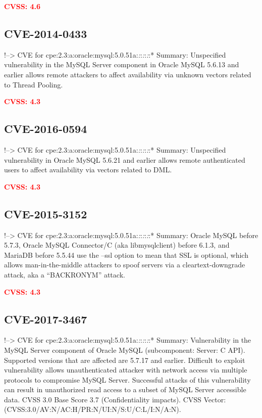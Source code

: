 \documentclass[a4paper, 12pt]{article}
\begin{document}
\textbf{\textcolor{red}{CVSS: 4.6}}

\hypertarget{cve-2014-0433}{%
\subsection{CVE-2014-0433}\label{cve-2014-0433}}

!--\textgreater{} CVE for
cpe:2.3:a:oracle:mysql:5.0.51a:\emph{:}:\emph{:}:\emph{:}:* Summary:
Unspecified vulnerability in the MySQL Server component in Oracle MySQL
5.6.13 and earlier allows remote attackers to affect availability via
unknown vectors related to Thread Pooling.

\textbf{\textcolor{red}{CVSS: 4.3}}

\hypertarget{cve-2016-0594}{%
\subsection{CVE-2016-0594}\label{cve-2016-0594}}

!--\textgreater{} CVE for
cpe:2.3:a:oracle:mysql:5.0.51a:\emph{:}:\emph{:}:\emph{:}:* Summary:
Unspecified vulnerability in Oracle MySQL 5.6.21 and earlier allows
remote authenticated users to affect availability via vectors related to
DML.

\textbf{\textcolor{red}{CVSS: 4.3}}

\hypertarget{cve-2015-3152}{%
\subsection{CVE-2015-3152}\label{cve-2015-3152}}

!--\textgreater{} CVE for
cpe:2.3:a:oracle:mysql:5.0.51a:\emph{:}:\emph{:}:\emph{:}:* Summary:
Oracle MySQL before 5.7.3, Oracle MySQL Connector/C (aka libmysqlclient)
before 6.1.3, and MariaDB before 5.5.44 use the --ssl option to mean
that SSL is optional, which allows man-in-the-middle attackers to spoof
servers via a cleartext-downgrade attack, aka a ``BACKRONYM'' attack.

\textbf{\textcolor{red}{CVSS: 4.3}}

\hypertarget{cve-2017-3467}{%
\subsection{CVE-2017-3467}\label{cve-2017-3467}}

!--\textgreater{} CVE for
cpe:2.3:a:oracle:mysql:5.0.51a:\emph{:}:\emph{:}:\emph{:}:* Summary:
Vulnerability in the MySQL Server component of Oracle MySQL
(subcomponent: Server: C API). Supported versions that are affected are
5.7.17 and earlier. Difficult to exploit vulnerability allows
unauthenticated attacker with network access via multiple protocols to
compromise MySQL Server. Successful attacks of this vulnerability can
result in unauthorized read access to a subset of MySQL Server
accessible data. CVSS 3.0 Base Score 3.7 (Confidentiality impacts). CVSS
Vector: (CVSS:3.0/AV:N/AC:H/PR:N/UI:N/S:U/C:L/I:N/A:N).
\end{document}
